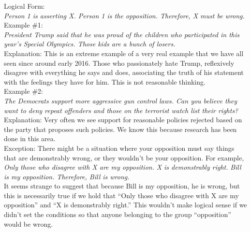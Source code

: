 \documentclass[a4paper,12pt,single,pdftex]{scrartcl}
\begin{document}
    
      Logical Form:
    \\

    
      {\em Person 1 is asserting X. \newline
Person 1 is the opposition. \newline
Therefore, X must be wrong.}
    \\

    
      Example \#1:
    \\

    
      {\em President Trump said that he was proud of the children who participated in this year's Special Olympics. Those kids are a bunch of losers.}
    \\

    
      Explanation: This is an extreme example of a very real example that we have all seen since around early 2016. Those who passionately hate Trump, reflexively disagree with everything he says and does, associating the truth of his statement with the feelings they have for him. This is not reasonable thinking.
    \\

    
      Example \#2:
    \\

    
      {\em The Democrats support more aggressive gun control laws. Can you believe they want to deny repeat offenders and those on the terrorist watch list their rights?}
    \\

    
      Explanation: Very often we see support for reasonable policies rejected based on the party that proposes such policies. We know this because research has been done in this area.
    \\

    
      Exception: There might be a situation where your opposition must say things that are demonstrably wrong, or they wouldn’t be your opposition. For example,
    \\

    
      {\em Only those who disagree with X are my opposition.} \newline
{\em X is demonstrably right.} \newline
{\em Bill is my opposition.} \newline
{\em Therefore, Bill is wrong.}
    \\

    
      It seems strange to suggest that because Bill is my opposition, he is wrong, but this is necessarily true if we hold that “Only those who disagree with X are my opposition” and “X is demonstrably right.” This wouldn’t make logical sense if we didn’t set the conditions so that anyone belonging to the group “opposition” would be wrong.
    \\
\end{document}
